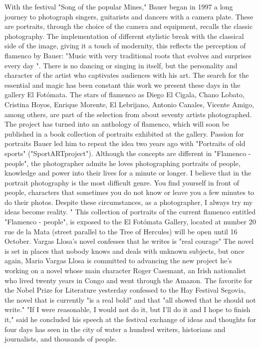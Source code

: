 With the festival "Song of the popular Mines," Bauer began in 1997 a long journey to photograph singers, guitarists and dancers with a camera plate.
These are portraits, through the choice of the camera and equipment, recalls the classic photography.
The implementation of different stylistic break with the classical side of the image, giving it a touch of modernity, this reflects the perception of flamenco by Bauer: "Music with very traditional roots that evolves and surprises every day ".
There is no dancing or singing in itself, but the personality and character of the artist who captivates audiences with his art.
The search for the essential and magic has been constant this work we present these days in the gallery El Fotómata.
The stars of flamenco as Diego El Cigala, Chano Lobato, Cristina Hoyos, Enrique Morente, El Lebrijano, Antonio Canales, Vicente Amigo, among others, are part of the selection from about seventy artists photographed.
The project has turned into an anthology of flamenco, which will soon be published in a book collection of portraits exhibited at the gallery.
Passion for portraits Bauer led him to repeat the idea two years ago with "Portraits of old sports" ("SportARTproject").
Although the concepts are different in "Flamenco - people", the photographer admits he loves photographing portraits of people, knowledge and power into their lives for a minute or longer.
I believe that in the portrait photography is the most difficult genre.
You find yourself in front of people, characters that sometimes you do not know or leave you a few minutes to do their photos.
Despite these circumstances, as a photographer, I always try my ideas become reality. "
This collection of portraits of the current flamenco entitled "Flamenco - people", is exposed to the El Fotómata Gallery, located at number 20 rue de la Mata (street parallel to the Tree of Hercules) will be open until 16 October.
Vargas Llosa's novel confesses that he writes is "real courage"
The novel is set in places that nobody knows and deals with unknown subjects, but once again, Mario Vargas Llosa is committed to advancing the new project he's working on a novel whose main character Roger Casemant, an Irish nationalist who lived twenty years in Congo and went through the Amazon.
The favorite for the Nobel Prize for Literature yesterday confessed to the Hay Festival Segovia, the novel that is currently "is a real bold" and that "all showed that he should not write."
"If I were reasonable, I would not do it, but I'll do it and I hope to finish it," said he concluded his speech at the festival exchange of ideas and thoughts for four days has seen in the city of water a hundred writers, historians and journalists, and thousands of people.
